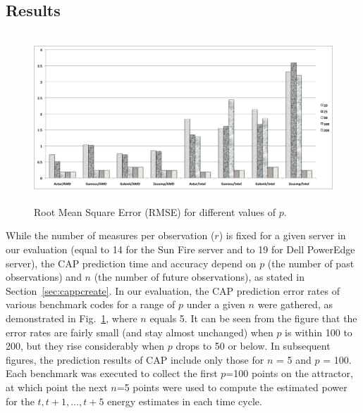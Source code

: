 \documentclass[prodmode,acmtaco,pdftex]{acmsmall}
\newcommand{\figurename}{Fig.}
\begin{document}
\subsection{Results}
\label{sec:htcase}
\begin{figure}[tp]
  \centering
  \includegraphics[width=1.0\linewidth,height=2.5in]{rmsep}
  \caption{Root Mean Square Error (RMSE) for different values of $p$.}
  \label{fig:rmsep}
\end{figure}
While the number of measures per observation ($r$) is fixed for a given
server in our evaluation (equal to 14 for the Sun Fire server and to 19
for Dell PowerEdge server), the CAP prediction time and accuracy depend
on $p$ (the number of past observations) and $n$ (the number of future
observations), as stated in Section~\ref{sec:cappcreate}.  In our
evaluation, the CAP prediction error rates of various benchmark codes
for a range of $p$ under a given $n$ were gathered, as demonstrated in
\figurename~\ref{fig:rmsep}, where $n$ equals 5.  It can be seen from
the figure that the error rates are fairly small (and stay almost
unchanged) when $p$ is within 100 to 200, but they rise considerably
when $p$ drops to 50 or below.  In subsequent figures, the prediction
results of CAP include only those for $n$ = 5 and $p$ = 100.  Each
benchmark was executed to collect the first $p$=100 points on the
attractor, at which point the next $n$=5 points were used to
compute the estimated power for the $t, t+1,\ldots,t+5$ energy estimates
in each time cycle.
\end{document}
